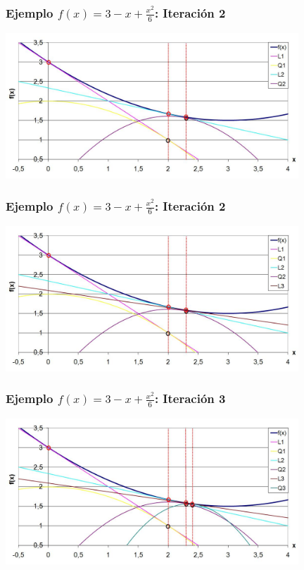 \documentclass[xcolor=dvipsnames, utf8, spanish]{beamer} %
\begin{document}
\begin{frame}
	\frametitle{Ejemplo $f(x)=3-x+\frac{x^2}{6}$: Iteración 2}
	\begin{center}
		\includegraphics[width=11cm]{figuras/ejemplo04.JPG}
	\end{center}
\end{frame}

\begin{frame}
	\frametitle{Ejemplo $f(x)=3-x+\frac{x^2}{6}$: Iteración 2}
	\begin{center}
		\includegraphics[width=11cm]{figuras/ejemplo05.JPG}
	\end{center}
\end{frame}

\begin{frame}
	\frametitle{Ejemplo $f(x)=3-x+\frac{x^2}{6}$: Iteración 3}
	\begin{center}
		\includegraphics[width=11cm]{figuras/ejemplo06.JPG}
	\end{center}
\end{frame}
\end{document}
